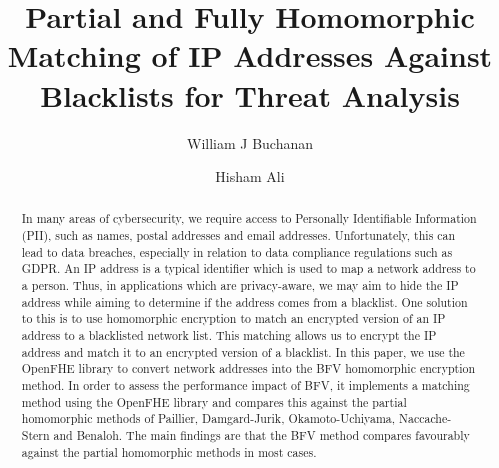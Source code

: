 \documentclass[envcountsame,runningheads,notitlepage]{llncs}
\begin{document}
\title{Partial and Fully Homomorphic Matching of IP Addresses Against Blacklists for Threat Analysis}

\author{
  William J Buchanan \and
  Hisham Ali
}


\begin{comment}
\author{\IEEEauthorblockN{William J Buchanan}
\IEEEauthorblockA{Blockpass ID Lab\
Edinburgh Napier University\\
Edinburgh\\
Email: b.buchanan@napier.ac.uk}
\and
\IEEEauthorblockN{Hisham Ali}
\IEEEauthorblockA{Blockpass ID Lab\
Edinburgh Napier University\\
Edinburgh\\
Email: H.Ali@napier.ac.uk}}
\end{comment}

\maketitle


\begin{abstract} 
In many areas of cybersecurity, we require access to Personally Identifiable Information (PII), such as names, postal addresses and email addresses. Unfortunately, this can lead to data breaches, especially in relation to data compliance regulations such as GDPR. An IP address is a typical identifier which is used to map a network address to a person. Thus, in applications which are privacy-aware, we may aim to hide the IP address while aiming to determine if the address comes from a blacklist. One solution to this is to use homomorphic encryption to match an encrypted version of an IP address to a blacklisted network list. This matching allows us to encrypt the IP address and match it to an encrypted version of a blacklist. In this paper, we use the OpenFHE library \cite{OpenFHE} to convert network addresses into the BFV homomorphic encryption method. In order to assess the performance impact of BFV, it implements a matching method using the OpenFHE library and compares this against the partial homomorphic methods of Paillier, Damgard-Jurik, Okamoto-Uchiyama, Naccache-Stern and Benaloh. The main findings are that the BFV method compares favourably against the partial homomorphic methods in most cases. 
\end{abstract}
\end{document}
